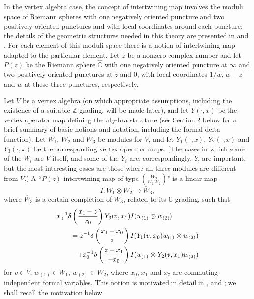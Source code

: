 \documentclass[12pt]{article}
\begin{document}
In the vertex algebra case, the concept of intertwining map involves the moduli
space of Riemann spheres with one negatively oriented puncture and two
positively oriented punctures and with local coordinates around each
puncture; the details of the geometric structures needed in this
theory are presented in \cite{H0} and \cite{H1}.  For each element of this moduli
space there is a notion of intertwining map adapted to the particular
element.  Let $z$ be a nonzero complex number and let $P(z)$ be the
Riemann sphere $\hat{\mathbb C}$ with one negatively oriented puncture
at $\infty$ and two positively oriented punctures at $z$ and $0$, with
local coordinates $1/w$, $w-z$ and $w$ at these three punctures,
respectively.

Let $V$ be a vertex algebra (on which appropriate assumptions,
including the existence of a suitable ${\mathbb Z}$-grading, will be made
later), and let $Y(\cdot,x)$ be the vertex operator map defining the
algebra structure (see Section 2 below for a brief summary of basic
notions and notation, including the formal delta function).  Let
$W_1$, $W_2$ and $W_3$ be modules for $V$, and let $Y_1(\cdot,x)$,
$Y_2(\cdot,x)$ and $Y_3(\cdot,x)$ be the corresponding vertex operator
maps.  (The cases in which some of the $W_i$ are $V$ itself, and some
of the $Y_i$ are, correspondingly, $Y$, are important, but the most
interesting cases are those where all three modules are different {}from
$V$.)  A ``$P(z)$-intertwining map of type ${W_3 \choose {W_1 W_2}}$''
is a linear map
\begin{equation}
I: W_1 \otimes W_2 \longrightarrow \overline{W}_3,
\end{equation}
where $\overline{W}_3$ is a certain completion of $W_3$, related to
its ${\mathbb C}$-grading, such that
\begin{eqnarray}\label{im-jacobi}
\lefteqn{x_0^{-1}\delta\left(\frac{ x_1-z}{x_0}\right)
Y_3(v, x_1)I(w_{(1)}\otimes w_{(2)})}\nno\\
&&=z^{-1}\delta\left(\frac{x_1-x_0}{z}\right)
I(Y_1(v, x_0)w_{(1)}\otimes w_{(2)})\nno\\
&&\hspace{2em}+x_0^{-1}\delta\left(\frac{z-x_1}{-x_0}\right)
I(w_{(1)}\otimes Y_2(v, x_1)w_{(2)})
\end{eqnarray}
for $v\in V$, $w_{(1)}\in W_1$, $w_{(2)}\in W_2$, where $x_0$,
$x_1$ and $x_2$ are commuting independent formal variables.  This
notion is motivated in detail in \cite{tensorK}, \cite{tensor1} and
\cite{tensor3}; we shall recall the motivation below.
\end{document}
